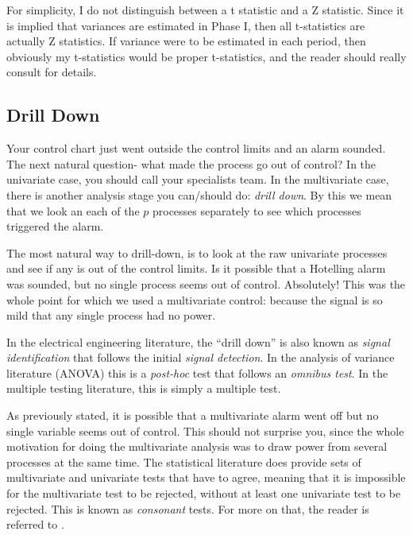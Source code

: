 \begin{remark}
For simplicity, I do not distinguish between a t statistic and a Z statistic.
Since it is implied that variances are estimated in Phase I, then all t-statistics are actually Z statistics.
If variance were to be estimated in each period, then obviously my t-statistics would be proper t-statistics, and the reader should really consult  \cite[Ch.7]{qiu_introduction_2013} for details. 
\end{remark}




\subsection{Drill Down}
Your control chart just went outside the control limits and an alarm sounded.
The next natural question- what made the process go out of control?
In the univariate case, you should call your specialists team. 
In the multivariate case, there is another analysis stage you can/should do: \emph{drill down}.
By this we mean that we look an each of the $p$ processes separately to see which processes triggered the alarm.

The most natural way to drill-down, is to look at the raw univariate processes and see if any is out of the control limits.
Is it possible that a Hotelling alarm was sounded, but no single process seems out of control.
Absolutely! 
This was the whole point for which we used a multivariate control: because the signal is so mild that any single process had no power.

\begin{extra}
In the electrical engineering literature, the ``drill down'' is also known as \emph{signal identification} that follows the initial \emph{signal detection}. 
In the analysis of variance literature (ANOVA) this is a \emph{post-hoc} test that follows an \emph{omnibus test}.
In the multiple testing literature, this is simply a multiple test. 
\end{extra}

\begin{extra}
As previously stated, it is possible that a multivariate alarm went off but no single variable seems out of control. 
This should not surprise you, since the whole motivation for doing the multivariate analysis was to draw power from several processes at the same time. 
The statistical literature does provide sets of multivariate and univariate tests that have to agree, meaning that it is impossible for the multivariate test to be rejected, without at least one univariate test to be rejected. 
This is known as \emph{consonant} tests. For more on that, the reader is referred to \cite{goeman_multiple_2011}.
\end{extra}







